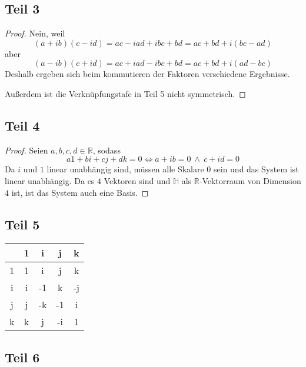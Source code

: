 \documentclass[10pt,a4paper]{article}
\begin{document}
\subsection*{Teil 3}

\begin{proof}
Nein, weil
\begin{equation}
(a + ib)(c - id) = ac - iad + ibc + bd = ac + bd + i(bc - ad)
\end{equation}
aber
\begin{equation}
(a - ib)(c + id) = ac + iad - ibc + bd = ac + bd + i(ad - bc)
\end{equation}
Deshalb ergeben sich beim kommutieren der Faktoren verschiedene Ergebnisse.

Außerdem ist die Verknüpfungstafe in Teil 5 nicht symmetrisch.
\end{proof}

\subsection*{Teil 4}

\begin{proof}
Seien $a, b, c, d \in \mathbb{R}$, sodass
\begin{equation}
a1 + bi + cj + dk = 0 \Leftrightarrow a + ib = 0\ \land\ c + id = 0
\end{equation}
Da $i$ und $1$ linear unabhängig sind, müssen alle Skalare $0$ sein und das System ist linear unabhängig.
Da es $4$ Vektoren sind und $\mathbb{H}$ als $\mathbb{R}$-Vektorraum von Dimension $4$ ist, ist das System auch eine Basis.
\end{proof}

\subsection*{Teil 5}

\begin{tabular}{c|c|c|c|c}
  & 1 & i & j & k\\
\hline
1 & 1 & i & j & k\\
\hline
i & i & -1 & k & -j\\
\hline
j & j & -k & -1 & i\\
\hline
k & k & j & -i & 1
\end{tabular}

\subsection*{Teil 6}
\end{document}
